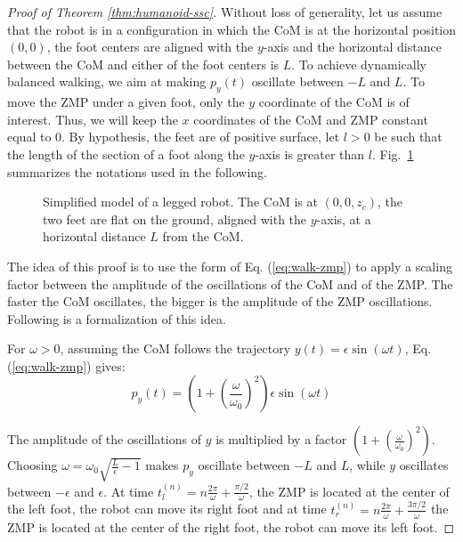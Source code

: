 \documentclass{article}
\begin{document}
\begin{proof}[Proof of Theorem \ref{thm:humanoid-ssc}]
Without loss of generality, let us assume that the robot is in a configuration
in which the CoM is at the horizontal position $(0,0)$, the foot centers  are 
aligned with the $y$-axis and the horizontal distance between the CoM and either of the foot centers
is $L$. To achieve dynamically balanced walking, we aim at making
$p_y(t)$ oscillate  between $-L$ and $L$. To move the ZMP  under a
given foot, only  the $y$ coordinate of the CoM  is of interest. Thus,
we will keep the $x$ coordinates  of the CoM and ZMP constant equal to
$0$. By hypothesis, the feet are of positive surface,
let $l>0$ be such that the length of the section of a foot along the 
$y$-axis is greater than $l$. Fig.~\ref{fig:simple-humanoid} summarizes the notations used
in the following.

\begin{figure}[h]
  \centering
  

  \caption{Simplified model of a legged robot. The CoM is at $(0,0,z_c)$, the two feet 
    are flat on the ground, aligned with the $y$-axis, at a horizontal distance $L$ 
    from the CoM.}
  \label{fig:simple-humanoid}
\end{figure}


The idea of this proof is to use the form of Eq. (\ref{eq:walk-zmp}) to
apply a  scaling factor between  the amplitude of the  oscillations of
the CoM and of the ZMP. The faster the CoM oscillates, the bigger is the amplitude
of the ZMP oscillations. Following is a formalization of this  idea.

For $\omega >0$, assuming the CoM follows the trajectory
$y(t) = \epsilon \sin(\omega t)$,  Eq. (\ref{eq:walk-zmp}) gives:
\[
p_y(t) =
(1+\left(\frac{\omega}{\omega_0}\right)^2)\epsilon\sin(\omega t)
\]

The
amplitude  of  the oscillations  of  $y$  is  multiplied by  a  factor
$(1+\left(\frac{\omega}{\omega_0}\right)^2)$.  Choosing  $\omega =
\omega_0 \sqrt{\frac{L}{\epsilon} -1}$ makes  $p_y$ oscillate between $-L$
and    $L$, while $y$ oscillates between $-\epsilon$ and $\epsilon$.   
At    time   $t_l^{(n)}    =    n\frac{2\pi}{\omega}   +
\frac{\pi/2}{\omega}$, the  ZMP is located  at the center of  the left
foot,  the robot  can move  its right  foot and  at time  $t_r^{(n)} =
n\frac{2\pi}{\omega}  + \frac{3\pi/2}{\omega}$ the  ZMP is  located at
the center of the right foot, the robot can move its left foot.


\end{proof}
\end{document}
